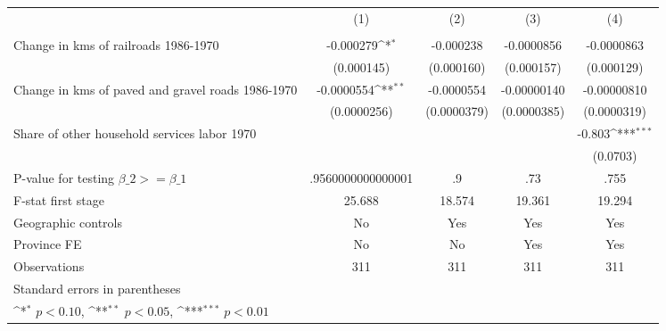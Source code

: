 {
\def\sym#1{\ifmmode^{#1}\else\(^{#1}\)\fi}
\begin{tabular}{l*{4}{c}}
\hline\hline
                &\multicolumn{1}{c}{(1)}&\multicolumn{1}{c}{(2)}&\multicolumn{1}{c}{(3)}&\multicolumn{1}{c}{(4)}\\
                &\multicolumn{1}{c}{}&\multicolumn{1}{c}{}&\multicolumn{1}{c}{}&\multicolumn{1}{c}{}\\
\hline
Change in kms of railroads 1986-1970&-0.000279\sym{*}  &-0.000238         &-0.0000856         &-0.0000863         \\
                &(0.000145)         &(0.000160)         &(0.000157)         &(0.000129)         \\
[1em]
Change in kms of paved and gravel roads 1986-1970&-0.0000554\sym{**} &-0.0000554         &-0.00000140         &-0.00000810         \\
                &(0.0000256)         &(0.0000379)         &(0.0000385)         &(0.0000319)         \\
[1em]
Share of other household services labor 1970&                  &                  &                  &   -0.803\sym{***}\\
                &                  &                  &                  & (0.0703)         \\
\hline
P-value for testing $\beta\_{2} >= \beta\_{1}$&.9560000000000001         &       .9         &      .73         &     .755         \\
F-stat first stage&   25.688         &   18.574         &   19.361         &   19.294         \\
Geographic controls&       No         &      Yes         &      Yes         &      Yes         \\
Province FE     &       No         &       No         &      Yes         &      Yes         \\
Observations    &      311         &      311         &      311         &      311         \\
\hline\hline
\multicolumn{5}{l}{\footnotesize Standard errors in parentheses}\\
\multicolumn{5}{l}{\footnotesize \sym{*} \(p<0.10\), \sym{**} \(p<0.05\), \sym{***} \(p<0.01\)}\\
\end{tabular}
}
